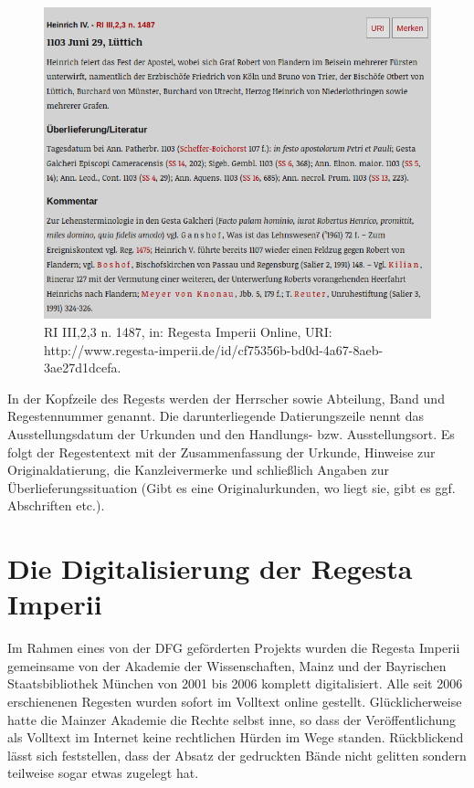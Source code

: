 \documentclass[ngerman,]{scrreprt}
\begin{document}
\begin{figure}
\centering
\includegraphics{Bilder/RI2Graph/ReggH4-Nr-1487.png}
\caption{RI III,2,3 n. 1487, in: Regesta Imperii Online, URI: http://www.regesta-imperii.de/id/cf75356b-bd0d-4a67-8aeb-3ae27d1dcefa.}
\end{figure}

In der Kopfzeile des Regests werden der Herrscher sowie Abteilung, Band und Regestennummer genannt. Die darunterliegende Datierungszeile nennt das Ausstellungsdatum der Urkunden und den Handlungs- bzw. Ausstellungsort. Es folgt der Regestentext mit der Zusammenfassung der Urkunde, Hinweise zur Originaldatierung, die Kanzleivermerke und schließlich Angaben zur Überlieferungssituation (Gibt es eine Originalurkunden, wo liegt sie, gibt es ggf. Abschriften etc.).

\hypertarget{die-digitalisierung-der-regesta-imperii}{%
\section{Die Digitalisierung der Regesta Imperii}\label{die-digitalisierung-der-regesta-imperii}}

Im Rahmen eines von der DFG geförderten Projekts wurden die Regesta Imperii gemeinsame von der Akademie der Wissenschaften, Mainz und der Bayrischen Staatsbibliothek München von 2001 bis 2006 komplett digitalisiert. Alle seit 2006 erschienenen Regesten wurden sofort im Volltext online gestellt. Glücklicherweise hatte die Mainzer Akademie die Rechte selbst inne, so dass der Veröffentlichung als Volltext im Internet keine rechtlichen Hürden im Wege standen. Rückblickend lässt sich feststellen, dass der Absatz der gedruckten Bände nicht gelitten sondern teilweise sogar etwas zugelegt hat.
\end{document}
